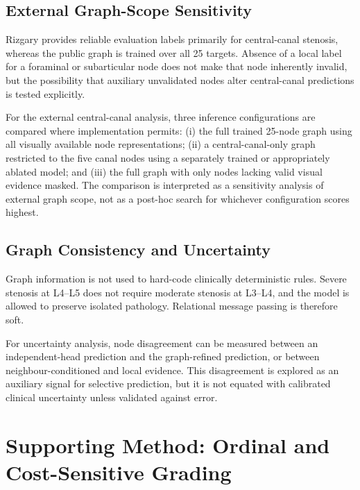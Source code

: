 \subsection{External Graph-Scope Sensitivity}
\label{sec:method-external-graph-scope}

Rizgary provides reliable evaluation labels primarily for central-canal
stenosis, whereas the public graph is trained over all 25 targets. Absence of a
local label for a foraminal or subarticular node does not make that node
inherently invalid, but the possibility that auxiliary unvalidated nodes alter
central-canal predictions is tested explicitly.

For the external central-canal analysis, three inference configurations are
compared where implementation permits: (i) the full trained 25-node graph using
all visually available node representations; (ii) a central-canal-only graph
restricted to the five canal nodes using a separately trained or appropriately
ablated model; and (iii) the full graph with only nodes lacking valid visual
evidence masked. The comparison is interpreted as a sensitivity analysis of
external graph scope, not as a post-hoc search for whichever configuration
scores highest.

\subsection{Graph Consistency and Uncertainty}
\label{sec:method-graph-uncertainty}

Graph information is not used to hard-code clinically deterministic rules.
Severe stenosis at L4--L5 does not require moderate stenosis at L3--L4, and the
model is allowed to preserve isolated pathology. Relational message passing is
therefore soft.

For uncertainty analysis, node disagreement can be measured between an
independent-head prediction and the graph-refined prediction, or between
neighbour-conditioned and local evidence. This disagreement is explored as an
auxiliary signal for selective prediction, but it is not equated with calibrated
clinical uncertainty unless validated against error.

\section{Supporting Method: Ordinal and Cost-Sensitive Grading}
\label{sec:method-ordinal}


